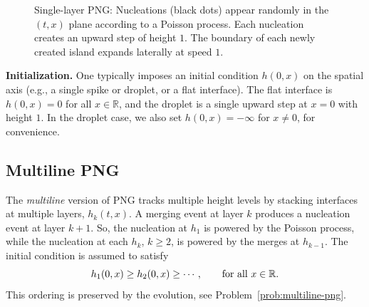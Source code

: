 \documentclass[letterpaper,11pt,oneside,reqno]{article}
\numberwithin{equation}{section}
\theoremstyle{definition}
\begin{document}
\begin{figure}[htpb]
\centering
{}
\caption{Single-layer PNG: Nucleations (black dots) appear randomly in the $(t,x)$ plane
according to a Poisson process. Each nucleation creates an upward step of height $1$. The boundary of each newly created island expands laterally at speed $1$.}
\label{fig:png-single}
\end{figure}

\smallskip

\noindent\textbf{Initialization.} One typically imposes an initial condition $h(0,x)$ on the spatial axis (e.g., a single spike or droplet, or a flat interface).
The flat interface is $h(0,x)=0$ for all $x\in\mathbb{R}$, and the droplet is a single upward step at $x=0$ with height $1$. In the droplet case, we also set $h(0,x)=-\infty$ for $x\ne 0$, for
convenience.

\subsection{Multiline PNG}
\label{sub:multiline-png}

The \emph{multiline} version of PNG tracks multiple height levels by stacking interfaces
at multiple layers, $h_k(t,x)$. A merging event
at layer $k$ produces a nucleation event at layer $k+1$.
So, the nucleation at $h_1$ is powered by the Poisson process,
while the nucleation at each $h_k$, $k\ge 2$, is powered by the merges at $h_{k-1}$.
The initial condition is assumed to satisfy
\begin{equation*}
	h_1(0,x) \ge h_2(0,x) \ge \cdots ,\qquad \textnormal{for all } x\in\mathbb{R}.
\end{equation*}
This ordering is preserved by the evolution,
see Problem~\ref{prob:multiline-png}.
\end{document}
